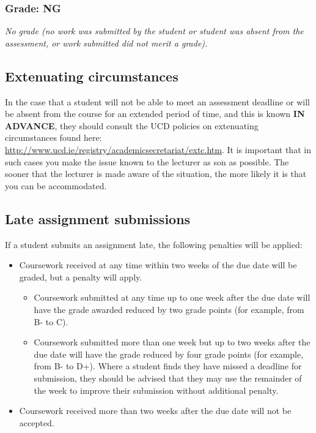 \documentclass[12pt,a4paper]{article}
\begin{document}
\subsubsection*{Grade: NG}

\textit{No grade (no work was submitted by the student or student was absent from the assessment, or work submitted did not merit a grade).}

\subsection*{Extenuating circumstances}

In the case that a student will not be able to meet an assessment deadline or will be absent from the course for an extended period of time, and this is known \textbf{IN ADVANCE}, they should consult the UCD policies on extenuating circumstances found here:
\url{http://www.ucd.ie/registry/academicsecretariat/extc.htm}. It is important that in such cases you make the issue known to the lecturer as son as possible. The sooner that the lecturer is made aware of the situation, the more likely it is that you can be accommodated.

\subsection*{Late assignment submissions}

If a student submits an assignment late, the following penalties will be applied:

\begin{itemize}
	\item Coursework received at any time within two weeks of the due date will be graded, but a penalty will apply.
	\begin{itemize}
		\item Coursework submitted at any time up to one week after the due date will have the grade awarded reduced by two grade points (for example, from B- to C).
		\item Coursework submitted more than one week but up to two weeks after the due date will have the grade reduced by four grade points (for example, from B- to D+).
Where a student finds they have missed a deadline for submission, they should be advised that they may use the remainder of the week to improve their submission without additional penalty.
	\end{itemize}
	\item Coursework received more than two weeks after the due date will not be accepted.
\end{itemize}
\end{document}
